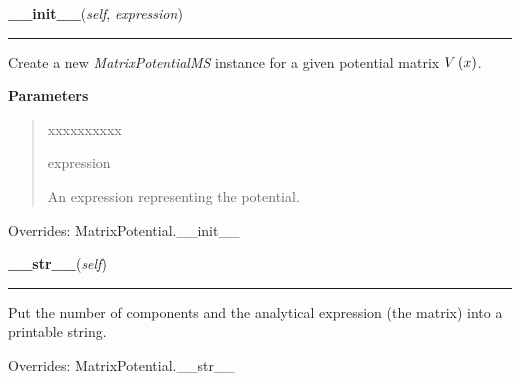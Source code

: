 \hspace{.8\funcindent}\begin{boxedminipage}{\funcwidth}

    \raggedright \textbf{\_\_init\_\_}(\textit{self}, \textit{expression})

    \vspace{-1.5ex}

    \rule{\textwidth}{0.5\fboxrule}
\setlength{\parskip}{2ex}
    Create a new \textit{MatrixPotentialMS} instance for a given potential
    matrix $V\left( x \right)$.

\setlength{\parskip}{1ex}
      \textbf{Parameters}
      \vspace{-1ex}

      \begin{quote}
        \begin{Ventry}{xxxxxxxxxx}

          \item[expression]

          An expression representing the potential.

        \end{Ventry}

      \end{quote}



      Overrides: MatrixPotential.\_\_init\_\_

    \end{boxedminipage}

    \vspace{0.5ex}

\hspace{.8\funcindent}\begin{boxedminipage}{\funcwidth}

    \raggedright \textbf{\_\_str\_\_}(\textit{self})

    \vspace{-1.5ex}

    \rule{\textwidth}{0.5\fboxrule}
\setlength{\parskip}{2ex}
    Put the number of components and the analytical expression (the matrix)
    into a printable string.

\setlength{\parskip}{1ex}


      Overrides: MatrixPotential.\_\_str\_\_

    \end{boxedminipage}

    \vspace{0.5ex}

